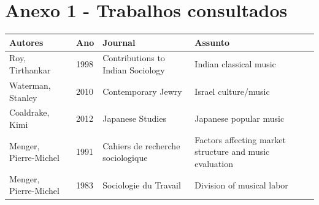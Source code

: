 \documentclass[a4paper, 12pt, openright, oneside, german, french, english, brazil]{abntex2}
\begin{document}
	\chapter*[Anexo 1]{Anexo 1 - Trabalhos consultados}






	\begin{SingleSpace}

	\begin{footnotesize}

	\begin{center}



	\begin{longtable}{p{4cm}lp{4cm}p{4cm}}







		\hline

		\textbf{Autores} &\textbf{Ano} & \textbf{Journal} & \textbf{Assunto}\\

		\hline

		\hline

		\endfirsthead

		\hline

		\endhead

		\hline

		\endfoot

		\hline

		\hline

		\endlastfoot



		Roy, Tirthankar & 1998 & Contributions to Indian Sociology & Indian classical music\\

		Waterman, Stanley & 2010 & Contemporary Jewry & Israel culture/music\\

		Coaldrake, Kimi	& 2012 & Japanese Studies & Japanese popular music\\

		Menger, Pierre-Michel & 1991 & Cahiers de recherche sociologique & Factors affecting market structure and music evaluation\\

		Menger, Pierre-Michel & 1983 & Sociologie du Travail & Division of musical labor\\


\end{longtable}
\end{center}
\end{footnotesize}
\end{SingleSpace}
\end{document}
